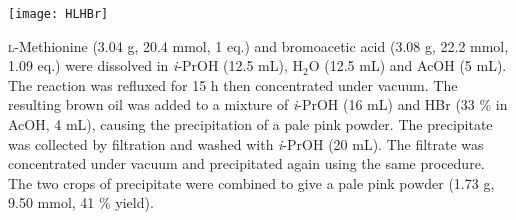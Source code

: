 {{{{{{{{{{\begin{scheme}[H]
	\begin{center}
		\texttt{[image: HLHBr]}
	\end{center}
\end{scheme}

\textsc{l}-Methionine (3.04 g, 20.4 mmol, 1 eq.) and bromoacetic acid (3.08 g, 22.2 mmol, 1.09 eq.) were dissolved in \textit{i}-PrOH (12.5 mL), H$_2$O (12.5 mL) and AcOH (5 mL). The reaction was refluxed for 15 h then concentrated under vacuum. The resulting brown oil was added to a mixture of \textit{i}-PrOH (16 mL) and HBr (33 \% in AcOH, 4 mL), causing the precipitation of a pale pink powder. The precipitate was collected by filtration and washed with \textit{i}-PrOH (20 mL). The filtrate was concentrated under vacuum and precipitated again using the same procedure. The two crops of precipitate were combined to give a pale pink powder (1.73 g, 9.50 mmol, 41 \% yield).
\\[1\baselineskip]
\\[1\baselineskip]
\\[1\baselineskip]
\\[1\baselineskip]
\\[1\baselineskip]
}}}}}}}}}}

